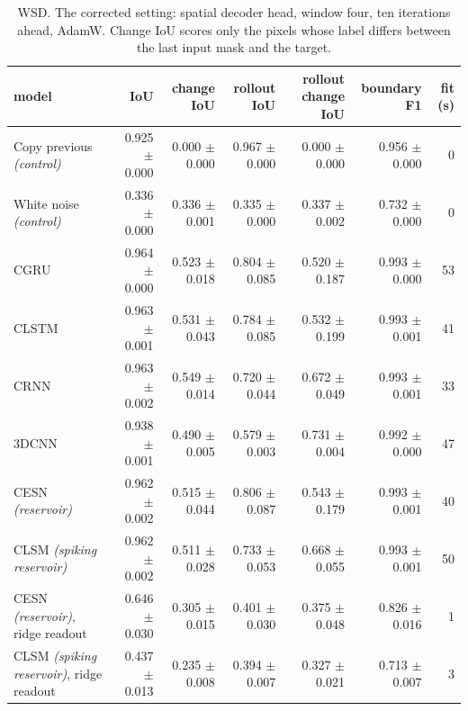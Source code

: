 \begin{table}[t]
\centering\small
\begin{tabular}{lrrrrrr}
\toprule
model & IoU & change IoU & rollout IoU & rollout change IoU & boundary F1 & fit (s) \\
\midrule
Copy previous \emph{(control)} & 0.925 {\scriptsize$\pm$ 0.000} & 0.000 {\scriptsize$\pm$ 0.000} & 0.967 {\scriptsize$\pm$ 0.000} & 0.000 {\scriptsize$\pm$ 0.000} & 0.956 {\scriptsize$\pm$ 0.000} & 0 \\
White noise \emph{(control)} & 0.336 {\scriptsize$\pm$ 0.000} & 0.336 {\scriptsize$\pm$ 0.001} & 0.335 {\scriptsize$\pm$ 0.000} & 0.337 {\scriptsize$\pm$ 0.002} & 0.732 {\scriptsize$\pm$ 0.000} & 0 \\
CGRU & 0.964 {\scriptsize$\pm$ 0.000} & 0.523 {\scriptsize$\pm$ 0.018} & 0.804 {\scriptsize$\pm$ 0.085} & 0.520 {\scriptsize$\pm$ 0.187} & 0.993 {\scriptsize$\pm$ 0.000} & 53 \\
CLSTM & 0.963 {\scriptsize$\pm$ 0.001} & 0.531 {\scriptsize$\pm$ 0.043} & 0.784 {\scriptsize$\pm$ 0.085} & 0.532 {\scriptsize$\pm$ 0.199} & 0.993 {\scriptsize$\pm$ 0.001} & 41 \\
CRNN & 0.963 {\scriptsize$\pm$ 0.002} & 0.549 {\scriptsize$\pm$ 0.014} & 0.720 {\scriptsize$\pm$ 0.044} & 0.672 {\scriptsize$\pm$ 0.049} & 0.993 {\scriptsize$\pm$ 0.001} & 33 \\
3DCNN & 0.938 {\scriptsize$\pm$ 0.001} & 0.490 {\scriptsize$\pm$ 0.005} & 0.579 {\scriptsize$\pm$ 0.003} & 0.731 {\scriptsize$\pm$ 0.004} & 0.992 {\scriptsize$\pm$ 0.000} & 47 \\
CESN \emph{(reservoir)} & 0.962 {\scriptsize$\pm$ 0.002} & 0.515 {\scriptsize$\pm$ 0.044} & 0.806 {\scriptsize$\pm$ 0.087} & 0.543 {\scriptsize$\pm$ 0.179} & 0.993 {\scriptsize$\pm$ 0.001} & 40 \\
CLSM \emph{(spiking reservoir)} & 0.962 {\scriptsize$\pm$ 0.002} & 0.511 {\scriptsize$\pm$ 0.028} & 0.733 {\scriptsize$\pm$ 0.053} & 0.668 {\scriptsize$\pm$ 0.055} & 0.993 {\scriptsize$\pm$ 0.001} & 50 \\
CESN \emph{(reservoir)}, ridge readout & 0.646 {\scriptsize$\pm$ 0.030} & 0.305 {\scriptsize$\pm$ 0.015} & 0.401 {\scriptsize$\pm$ 0.030} & 0.375 {\scriptsize$\pm$ 0.048} & 0.826 {\scriptsize$\pm$ 0.016} & 1 \\
CLSM \emph{(spiking reservoir)}, ridge readout & 0.437 {\scriptsize$\pm$ 0.013} & 0.235 {\scriptsize$\pm$ 0.008} & 0.394 {\scriptsize$\pm$ 0.007} & 0.327 {\scriptsize$\pm$ 0.021} & 0.713 {\scriptsize$\pm$ 0.007} & 3 \\
\bottomrule
\end{tabular}
\caption{WSD. The corrected setting: spatial decoder head, window four, ten iterations ahead, AdamW. Change IoU scores only the pixels whose label differs between the last input mask and the target.}
\label{tab:blockG}
\end{table}

